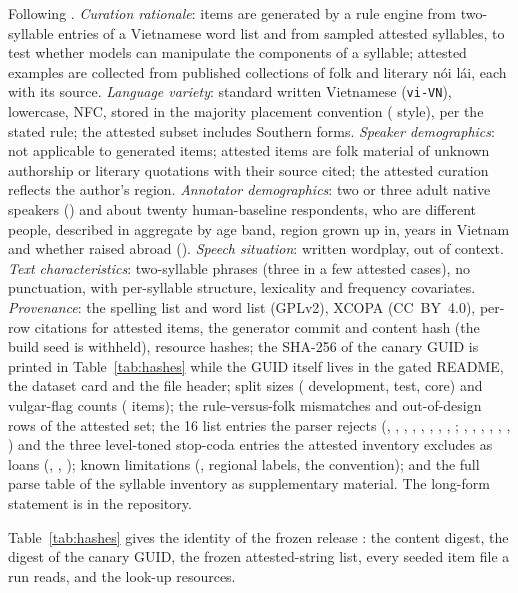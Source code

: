 Following \citet{Q18-1041}. \emph{Curation rationale}: items are generated by a rule engine from two-syllable entries of a Vietnamese word list and from sampled attested syllables, to test whether models can manipulate the components of a syllable; attested examples are collected from published collections of folk and literary nói lái, each with its source. \emph{Language variety}: standard written Vietnamese (\texttt{vi-VN}), lowercase, NFC, stored in the majority placement convention (\releasePlacementStyle{} style),  per the stated rule; the attested subset includes Southern forms. \emph{Speaker demographics}: not applicable to generated items; attested items are folk material of unknown authorship or literary quotations with their source cited; the attested curation reflects the author's region. \emph{Annotator demographics}: two or three adult native speakers () and about twenty human-baseline respondents, who are different people, described in aggregate by age band, region grown up in, years in Vietnam and whether raised abroad (). \emph{Speech situation}: written wordplay, out of context. \emph{Text characteristics}: two-syllable phrases (three in a few attested cases), no punctuation, with per-syllable structure, lexicality and frequency covariates. \emph{Provenance}: the spelling list and word list (GPLv2), XCOPA (CC~BY~4.0), per-row citations for attested items, the generator commit and content hash (the build seed is withheld), resource hashes; the SHA-256 of the canary GUID is printed in Table~\ref{tab:hashes} while the GUID itself lives in the gated README, the dataset card and the file header; split sizes (\releaseNDev{} development, \releaseNTest{} test, \releaseNCore{} core) and vulgar-flag counts (\releaseNVulgar{} items); the rule-versus-folk mismatches and out-of-design rows of the attested set; the 16 list entries the parser rejects (, , , , , , , , ; , , , , , , ) and the three level-toned stop-coda entries the attested inventory excludes as loans (, , ); known limitations (, regional labels, the  convention); and the full parse table of the syllable inventory as supplementary material. The long-form statement is in the repository.

Table~\ref{tab:hashes} gives the identity of the frozen release \releaseVersion{}: the content digest, the digest of the canary GUID, the frozen attested-string list, every seeded item file a run reads, and the look-up resources.

